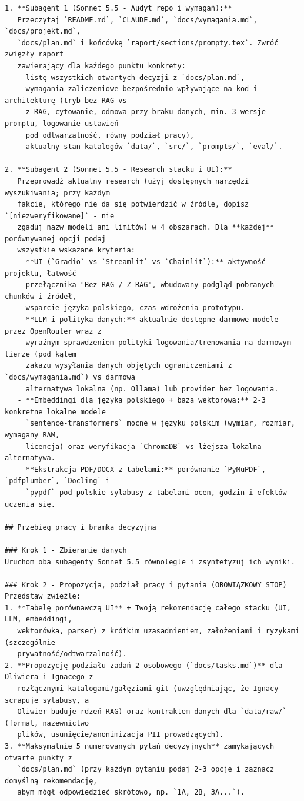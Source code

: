 \begin{lstlisting}
1. **Subagent 1 (Sonnet 5.5 - Audyt repo i wymagań):**
   Przeczytaj `README.md`, `CLAUDE.md`, `docs/wymagania.md`, `docs/projekt.md`,
   `docs/plan.md` i końcówkę `raport/sections/prompty.tex`. Zwróć zwięzły raport
   zawierający dla każdego punktu konkrety:
   - listę wszystkich otwartych decyzji z `docs/plan.md`,
   - wymagania zaliczeniowe bezpośrednio wpływające na kod i architekturę (tryb bez RAG vs
     z RAG, cytowanie, odmowa przy braku danych, min. 3 wersje promptu, logowanie ustawień
     pod odtwarzalność, równy podział pracy),
   - aktualny stan katalogów `data/`, `src/`, `prompts/`, `eval/`.

2. **Subagent 2 (Sonnet 5.5 - Research stacku i UI):**
   Przeprowadź aktualny research (użyj dostępnych narzędzi wyszukiwania; przy każdym
   fakcie, którego nie da się potwierdzić w źródle, dopisz `[niezweryfikowane]` - nie
   zgaduj nazw modeli ani limitów) w 4 obszarach. Dla **każdej** porównywanej opcji podaj
   wszystkie wskazane kryteria:
   - **UI (`Gradio` vs `Streamlit` vs `Chainlit`):** aktywność projektu, łatwość
     przełącznika "Bez RAG / Z RAG", wbudowany podgląd pobranych chunków i źródeł,
     wsparcie języka polskiego, czas wdrożenia prototypu.
   - **LLM i polityka danych:** aktualnie dostępne darmowe modele przez OpenRouter wraz z
     wyraźnym sprawdzeniem polityki logowania/trenowania na darmowym tierze (pod kątem
     zakazu wysyłania danych objętych ograniczeniami z `docs/wymagania.md`) vs darmowa
     alternatywa lokalna (np. Ollama) lub provider bez logowania.
   - **Embeddingi dla języka polskiego + baza wektorowa:** 2-3 konkretne lokalne modele
     `sentence-transformers` mocne w języku polskim (wymiar, rozmiar, wymagany RAM,
     licencja) oraz weryfikacja `ChromaDB` vs lżejsza lokalna alternatywa.
   - **Ekstrakcja PDF/DOCX z tabelami:** porównanie `PyMuPDF`, `pdfplumber`, `Docling` i
     `pypdf` pod polskie sylabusy z tabelami ocen, godzin i efektów uczenia się.

## Przebieg pracy i bramka decyzyjna

### Krok 1 - Zbieranie danych
Uruchom oba subagenty Sonnet 5.5 równolegle i zsyntetyzuj ich wyniki.

### Krok 2 - Propozycja, podział pracy i pytania (OBOWIĄZKOWY STOP)
Przedstaw zwięźle:
1. **Tabelę porównawczą UI** + Twoją rekomendację całego stacku (UI, LLM, embeddingi,
   wektorówka, parser) z krótkim uzasadnieniem, założeniami i ryzykami (szczególnie
   prywatność/odtwarzalność).
2. **Propozycję podziału zadań 2-osobowego (`docs/tasks.md`)** dla Oliwiera i Ignacego z
   rozłącznymi katalogami/gałęziami git (uwzględniając, że Ignacy scrapuje sylabusy, a
   Oliwier buduje rdzeń RAG) oraz kontraktem danych dla `data/raw/` (format, nazewnictwo
   plików, usunięcie/anonimizacja PII prowadzących).
3. **Maksymalnie 5 numerowanych pytań decyzyjnych** zamykających otwarte punkty z
   `docs/plan.md` (przy każdym pytaniu podaj 2-3 opcje i zaznacz domyślną rekomendację,
   abym mógł odpowiedzieć skrótowo, np. `1A, 2B, 3A...`).


\end{lstlisting}
